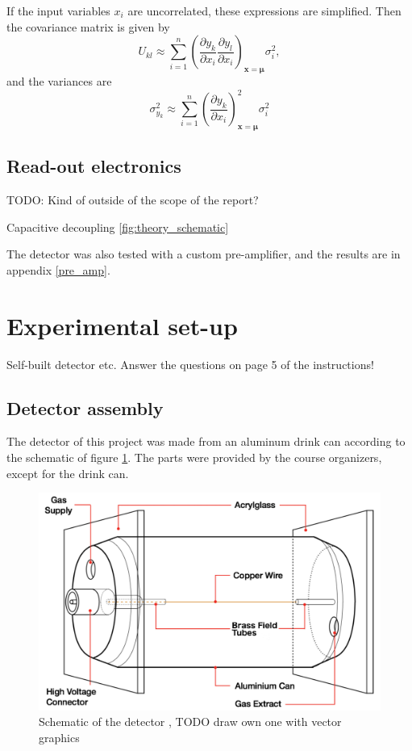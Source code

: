 \documentclass[a4paper]{article}
\begin{document}
If the input variables $x_i$ are uncorrelated, these expressions are simplified.
Then the covariance matrix is given by
\begin{equation}
U_{kl} \approx \sum_{i=1}^n \left( \frac{\partial y_k}{\partial x_i} \frac{\partial y_l}{\partial x_i} \right)_{\mathbf{x}=\mathbf{\mu}} \sigma_i^2,
\end{equation}
and the variances are
\begin{equation}
\sigma_{y_k}^2 \approx \sum_{i=1}^n \left( \frac{\partial y_k}{\partial x_i} \right)_{\mathbf{x}=\mathbf{\mu}}^2 \sigma_i^2
\end{equation}
\cite[p. 20--22]{cowan_statistical_1998}


\subsection{Read-out electronics}
\label{electronics}

TODO: Kind of outside of the scope of the report?

Capacitive decoupling \ref{fig:theory_schematic}

The detector was also tested with a custom pre-amplifier, and the results are in appendix \ref{pre_amp}.



\section{Experimental set-up}
\label{setup}
Self-built detector etc.
Answer the questions on page 5 of the instructions!


\subsection{Detector assembly}
\label{assembly}
The detector of this project was made from an aluminum drink can according to the schematic of figure \ref{fig:schematic}.
The parts were provided by the course organizers, except for the drink can.

\begin{figure}[ht!]
\centering
\includegraphics[width=\textwidth]{fig/instructions/schematic.png}
\caption{Schematic of the detector \cite{instructions}, TODO draw own one with vector graphics}
\label{fig:schematic}
\end{figure}
\end{document}
